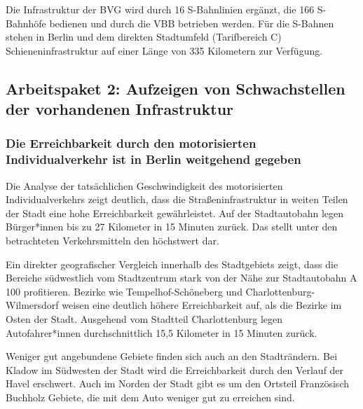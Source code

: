 Die Infrastruktur der BVG wird durch 16 S-Bahnlinien ergänzt, die 166 S-Bahnhöfe bedienen und durch die VBB betrieben werden. Für die S-Bahnen stehen in Berlin und dem direkten Stadtumfeld (Tarifbereich C) Schieneninfrastruktur auf einer Länge von 335 Kilometern zur Verfügung.


\subsection{Arbeitspaket 2: Aufzeigen von Schwachstellen der vorhandenen Infrastruktur}
\label{arbeitspaket_2_aufzeigen_von_schwachstellen_der_vorhandenen_infrastruktur}


\subsubsection{Die Erreichbarkeit durch den motorisierten Individualverkehr ist in Berlin weitgehend gegeben}

Die Analyse der tatsächlichen Geschwindigkeit des motorisierten Individualverkehrs zeigt deutlich, dass die Straßeninfrastruktur in weiten Teilen der Stadt eine hohe Erreichbarkeit gewährleistet. Auf der Stadtautobahn legen Bürger*innen bis zu 27 Kilometer in 15 Minuten zurück. Das stellt unter den betrachteten Verkehrsmitteln den höchstwert dar.


Ein direkter geografischer Vergleich innerhalb des Stadtgebiets zeigt, dass die Bereiche südwestlich vom Stadtzentrum stark von der Nähe zur Stadtautobahn A 100 profitieren. Bezirke wie Tempelhof-Schöneberg und Charlottenburg-Wilmersdorf weisen eine deutlich höhere Erreichbarkeit auf, als die Bezirke im Osten der Stadt. Ausgehend vom Stadtteil Charlottenburg legen Autofahrer*innen durchschnittlich 15,5 Kilometer in 15 Minuten zurück.

Weniger gut angebundene Gebiete finden sich auch an den Stadträndern. Bei Kladow im Südwesten der Stadt wird die Erreichbarkeit durch den Verlauf der Havel erschwert. Auch im Norden der Stadt gibt es um den Ortsteil Französisch Buchholz Gebiete, die mit dem Auto weniger gut zu erreichen sind.

